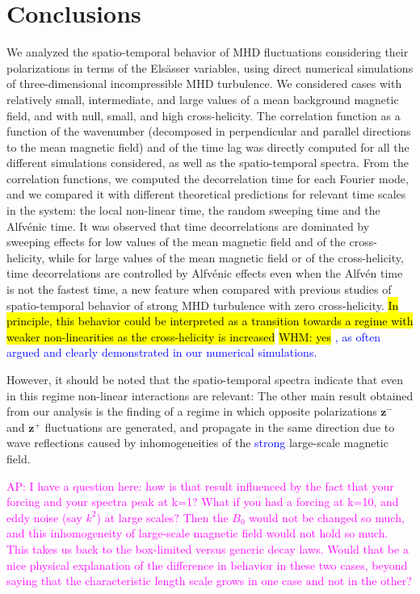 \documentclass[aip,pop,reprint,amsmath,amssymb,floatfix]{revtex4-1}
\def\ADD#1{{\textcolor{blue}{#1}}}
\def\AD#1{{\textcolor{magenta}{#1}}}
\def\WHM#1{{\hl{WHM: #1}}}
\renewcommand{\vec}[1]{\mathbf{#1}}
\begin{document}
\section{Conclusions}\label{sec_Conclusions}

We analyzed the spatio-temporal behavior of MHD fluctuations considering their polarizations in terms of the Els\"asser variables, using direct numerical simulations of three-dimensional incompressible MHD turbulence. We considered cases with relatively small, intermediate, and large values of a mean background magnetic field, and with null, small, and high cross-helicity. The correlation function as a function of the wavenumber (decomposed in perpendicular and parallel directions to the mean magnetic field) and of the time lag was directly computed for all the different simulations considered, as well as the spatio-temporal spectra. From the correlation functions, we computed the decorrelation time for each Fourier mode, and we compared it with different theoretical predictions for relevant time scales in the system: the local non-linear time, the random sweeping time and the Alfv\'enic time. It was observed that time decorrelations are dominated by sweeping effects for low values of the mean magnetic field and of the cross-helicity, while for large values of the mean magnetic field or of the cross-helicity, time decorrelations are controlled by Alfv\'enic effects even when the Alfv\'en time is not the fastest time, a new feature when compared with previous studies of spatio-temporal behavior of strong MHD turbulence with zero cross-helicity. \hl{In principle, this behavior could be interpreted as a transition towards a regime with weaker non-linearities as the cross-helicity is increased} \WHM{yes}
\ADD{, as often argued and clearly demonstrated in our numerical simulations.}

However, it should be noted that the spatio-temporal spectra indicate that even in this regime non-linear interactions are relevant: The other main result obtained from our analysis is the finding of a regime in which opposite polarizations $\vec{z}^-$ and $\vec{z}^+$ fluctuations are generated, and propagate in the same direction due to wave reflections caused by inhomogeneities of the 
\ADD{strong}
large-scale magnetic field. 

\AD{AP: I have a question here: how is that result influenced by the fact that your forcing and your spectra peak at k=1? What if you had a forcing at k=10, and eddy noise (say $k^2$) at large scales? Then the $B_0$ would not be changed so much, and this inhomogeneity of large-scale magnetic field would not hold so much. This takes us back to the box-limited versus generic decay laws. Would that be a nice physical explanation of the difference in behavior in these two cases, beyond saying that the characteristic length scale grows in one case and not in the other?}
\end{document}
